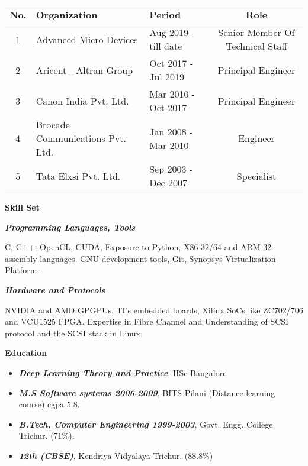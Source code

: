 \documentclass[a4paper,10pt]{memoir} %
\newcommand{\Sep}{\vspace{1em}} %
\newcommand{\SmallSep}{\vspace{0.5em}} %
\newcommand{\CVSection}[1]{ %
{\Large\textbf{#1}}\par
\SmallSep %
}
\newcommand{\CVItem}[2]{ %
\textbf{\color{RoyalBlue} #1}\par
#2
\SmallSep %
}
\begin{document}
\begin{center}
\begin{tabular}{ |c|l|l|c| } 
 \hline
 \textbf{No.} & \textbf{Organization} & \textbf{Period} & \textbf{Role} \\
 \hline
 1 & Advanced Micro Devices & Aug 2019 - till date & Senior Member Of Technical Staff \\
 \hline 
 2 & Aricent - Altran Group & Oct 2017 - Jul 2019 & Principal Engineer \\ 
 \hline
 3 & Canon India Pvt. Ltd. & Mar 2010 - Oct 2017 & Principal Engineer \\ 
 \hline
 4 & Brocade Communications Pvt. Ltd. & Jan 2008 - Mar 2010 & Engineer\\ 
 \hline
 5 & Tata Elxsi Pvt. Ltd. & Sep 2003 - Dec 2007 & Specialist \\ 
 \hline
\end{tabular}
\end{center}


\CVSection{Skill Set}

\CVItem{\textit{Programming Languages, Tools}} {
C, C++, OpenCL, CUDA, Exposure to Python, X86 32/64 and ARM 32 assembly languages. GNU development tools, Git, Synopsys Virtualization Platform.
}

\CVItem{\textit{Hardware and Protocols}} {
NVIDIA and AMD GPGPUs, TI's embedded boards, Xilinx SoCs like ZC702/706 and VCU1525 FPGA. 
Expertise in Fibre Channel and Understanding of SCSI protocol and the SCSI stack in Linux.
}
\Sep




\CVSection{Education}
\begin{itemize}
\item \textbf{\color{RoyalBlue} \textit {Deep Learning Theory and Practice}}, IISc Bangalore
\item \textbf{\color{RoyalBlue} \textit {M.S Software systems 2006-2009}}, BITS Pilani (Distance learning course) cgpa 5.8.
\item \textbf{\color{RoyalBlue} \textit {B.Tech, Computer Engineering 1999-2003}}, Govt. Engg. College Trichur. (71\%).
\item \textbf{\color{RoyalBlue} \textit {12th (CBSE)}}, Kendriya Vidyalaya Trichur. (88.8\%)

\end{itemize}
\Sep %
\end{document}
